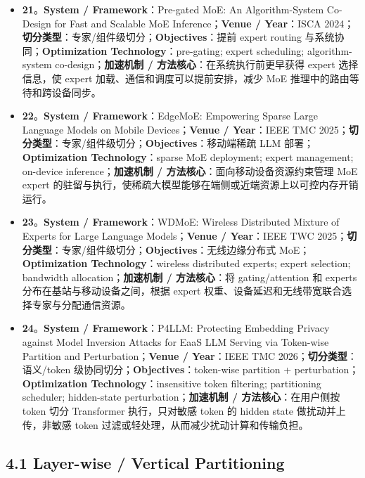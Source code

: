 \documentclass[a4paper,twocolumn,10pt]{ctexart}
\begin{document}
\begin{itemize}
\item \textbf{21}。\textbf{System / Framework}：Pre-gated MoE: An Algorithm-System Co-Design for Fast and Scalable MoE Inference；\textbf{Venue / Year}：ISCA 2024；\textbf{切分类型}：专家/组件级切分；\textbf{Objectives}：提前 expert routing 与系统协同；\textbf{Optimization Technology}：pre-gating; expert scheduling; algorithm-system co-design；\textbf{加速机制 / 方法核心}：在系统执行前更早获得 expert 选择信息，使 expert 加载、通信和调度可以提前安排，减少 MoE 推理中的路由等待和跨设备同步。
\item \textbf{22}。\textbf{System / Framework}：EdgeMoE: Empowering Sparse Large Language Models on Mobile Devices；\textbf{Venue / Year}：IEEE TMC 2025；\textbf{切分类型}：专家/组件级切分；\textbf{Objectives}：移动端稀疏 LLM 部署；\textbf{Optimization Technology}：sparse MoE deployment; expert management; on-device inference；\textbf{加速机制 / 方法核心}：面向移动设备资源约束管理 MoE expert 的驻留与执行，使稀疏大模型能够在端侧或近端资源上以可控内存开销运行。
\item \textbf{23}。\textbf{System / Framework}：WDMoE: Wireless Distributed Mixture of Experts for Large Language Models；\textbf{Venue / Year}：IEEE TWC 2025；\textbf{切分类型}：专家/组件级切分；\textbf{Objectives}：无线边缘分布式 MoE；\textbf{Optimization Technology}：wireless distributed experts; expert selection; bandwidth allocation；\textbf{加速机制 / 方法核心}：将 gating/attention 和 experts 分布在基站与移动设备之间，根据 expert 权重、设备延迟和无线带宽联合选择专家与分配通信资源。
\item \textbf{24}。\textbf{System / Framework}：P4LLM: Protecting Embedding Privacy against Model Inversion Attacks for EaaS LLM Serving via Token-wise Partition and Perturbation；\textbf{Venue / Year}：IEEE TMC 2026；\textbf{切分类型}：语义/token 级协同切分；\textbf{Objectives}：token-wise partition + perturbation；\textbf{Optimization Technology}：insensitive token filtering; partitioning scheduler; hidden-state perturbation；\textbf{加速机制 / 方法核心}：在用户侧按 token 切分 Transformer 执行，只对敏感 token 的 hidden state 做扰动并上传，非敏感 token 过滤或轻处理，从而减少扰动计算和传输负担。
\end{itemize}



\subsection{4.1 Layer-wise / Vertical Partitioning}
\end{document}
